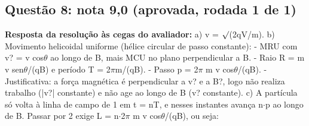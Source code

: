 \documentclass{article}%
\begin{document}
\subsection*{Questão 8: nota 9,0 (aprovada, rodada 1 de 1)}%
\textbf{Resposta da resolução às cegas do avaliador:} a) v = $\surd$(2qV/m).\newline%
\newline%
b) Movimento helicoidal uniforme (hélice circular de passo constante):\newline%
{-} MRU com v? = v cos$\theta$ ao longo de B, mais MCU no plano perpendicular a B.\newline%
{-} Raio R = m v sen$\theta$/(qB) e período T = 2$\pi$m/(qB).\newline%
{-} Passo p = 2$\pi$ m v cos$\theta$/(qB).\newline%
{-} Justificativa: a força magnética é perpendicular a v? e a B?, logo não realiza trabalho (|v?| constante) e não age ao longo de B (v? constante).\newline%
\newline%
c) A partícula só volta à linha de campo de 1 em t = nT, e nesses instantes avança n$\cdot$p ao longo de B. Passar por 2 exige L = n$\cdot$2$\pi$ m v cos$\theta$/(qB), ou seja:\newline%
\newline%
\end{document}
